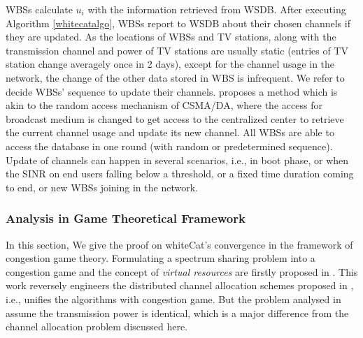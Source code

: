 \documentclass[times]{ettauth}
\newcommand{\ie}{i.e., }
\theoremstyle{mytheoremstyle}
\theoremstyle{mytheoremstyle}
\theoremstyle{mytheoremstyle}
\begin{document}
WBSs calculate $u_i$ with the information retrieved from WSDB.
After executing Algorithm \ref{whitecatalgo}, WBSs report to WSDB about their chosen channels if they are updated.
As the locations of WBSs and TV stations, along with the transmission channel and power of TV stations are usually static (entries of TV station change averagely once in 2 days\cite{SenseLess2011}), except for the channel usage in the network, the change of the other data stored in WBS is infrequent. 
We refer \cite{CApotentialLearning_05dyspan} to decide WBSs' sequence to update their channels.
\cite{CApotentialLearning_05dyspan} proposes a method which is akin to the random access mechanism of CSMA/DA, where the access for broadcast medium is changed to get access to the centralized center to retrieve the current channel usage and update its new channel. 
All WBSs are able to access the database in one round (with random or predetermined sequence). 
Update of channels can happen in several scenarios, \ie in boot phase, or when the SINR on end users falling below a threshold, or a fixed time duration coming to end, or new WBSs joining in the network. 


\subsubsection{Analysis in Game Theoretical Framework}
\label{game}
In this section, We give the proof on whiteCat's convergence in the framework of congestion game theory.
Formulating a spectrum sharing problem into a congestion game and the concept of \textit{virtual resources} are firstly proposed in \cite{allerton08_liu}.
This work reversely engineers the distributed channel allocation schemes proposed in \cite{babadi_08, Ko_DistributedCA}, \ie unifies the algorithms with congestion game.
But the problem analysed in~\cite{allerton08_liu} assume the transmission power is identical, which is a major difference from the channel allocation problem discussed here. 
\end{document}
